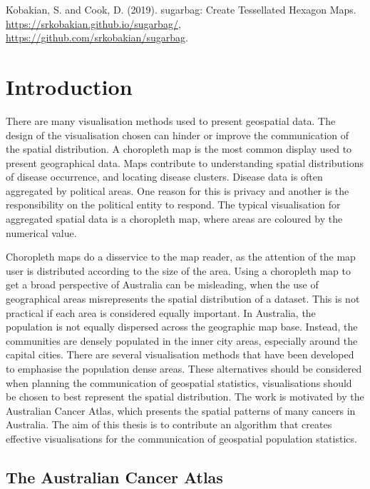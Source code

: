 \documentclass{monashthesis}
\begin{document}
Kobakian, S. and Cook, D. (2019). sugarbag: Create Tessellated Hexagon Maps. \url{https://srkobakian.github.io/sugarbag/}, \url{https://github.com/srkobakian/sugarbag}.

\clearpage{}\setcounter{page}{0}

\hypertarget{ch:intro}{%
\chapter{Introduction}\label{ch:intro}}

There are many visualisation methods used to present geospatial data. The design of the visualisation chosen can hinder or improve the communication of the spatial distribution. A choropleth map is the most common display used to present geographical data. Maps contribute to understanding spatial distributions of disease occurrence, and locating disease clusters. Disease data is often aggregated by political areas. One reason for this is privacy and another is the responsibility on the political entity to respond. The typical visualisation for aggregated spatial data is a choropleth map, where areas are coloured by the numerical value.

Choropleth maps do a disservice to the map reader, as the attention of the map user is distributed according to the size of the area. Using a choropleth map to get a broad perspective of Australia can be misleading, when the use of geographical areas misrepresents the spatial distribution of a dataset. This is not practical if each area is considered equally important. In Australia, the population is not equally dispersed across the geographic map base.
Instead, the communities are densely populated in the inner city areas, especially around the capital cities. There are several visualisation methods that have been developed to emphasise the population dense areas. These alternatives should be considered when planning the communication of geospatial statistics, visualisations should be chosen to best represent the spatial distribution. The work is motivated by the Australian Cancer Atlas,
which presents the spatial patterns of many cancers in Australia. The aim of this thesis is to contribute an algorithm that creates effective visualisations for the communication of geospatial population statistics.

\hypertarget{the-australian-cancer-atlas}{%
\section{The Australian Cancer Atlas}\label{the-australian-cancer-atlas}}
\end{document}
